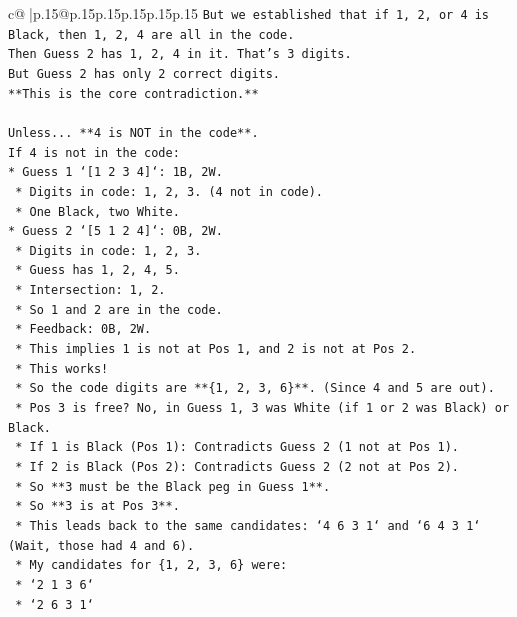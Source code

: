 \documentclass{article}
\begin{document}
{\begin{supertabular}{c@{$\;$}|p{.15\linewidth}@{}p{.15\linewidth}p{.15\linewidth}p{.15\linewidth}p{.15\linewidth}p{.15\linewidth}}
{{{\texttt{But we established that if 1, 2, or 4 is Black, then 1, 2, 4 are all in the code.} \\
\texttt{Then Guess 2 has 1, 2, 4 in it. That's 3 digits.} \\
\texttt{But Guess 2 has only 2 correct digits.} \\
\texttt{**This is the core contradiction.**} \\
\\ 
\texttt{Unless... **4 is NOT in the code**.} \\
\texttt{If 4 is not in the code:} \\
\texttt{*   Guess 1 `{[}1 2 3 4{]}`: 1B, 2W.} \\
\texttt{    *   Digits in code: 1, 2, 3. (4 not in code).} \\
\texttt{    *   One Black, two White.} \\
\texttt{*   Guess 2 `{[}5 1 2 4{]}`: 0B, 2W.} \\
\texttt{    *   Digits in code: 1, 2, 3.} \\
\texttt{    *   Guess has 1, 2, 4, 5.} \\
\texttt{    *   Intersection: 1, 2.} \\
\texttt{    *   So 1 and 2 are in the code.} \\
\texttt{    *   Feedback: 0B, 2W.} \\
\texttt{    *   This implies 1 is not at Pos 1, and 2 is not at Pos 2.} \\
\texttt{    *   This works!} \\
\texttt{    *   So the code digits are **\{1, 2, 3, 6\}**. (Since 4 and 5 are out).} \\
\texttt{    *   Pos 3 is free? No, in Guess 1, 3 was White (if 1 or 2 was Black) or Black.} \\
\texttt{    *   If 1 is Black (Pos 1): Contradicts Guess 2 (1 not at Pos 1).} \\
\texttt{    *   If 2 is Black (Pos 2): Contradicts Guess 2 (2 not at Pos 2).} \\
\texttt{    *   So **3 must be the Black peg in Guess 1**.} \\
\texttt{    *   So **3 is at Pos 3**.} \\
\texttt{    *   This leads back to the same candidates: `4 6 3 1` and `6 4 3 1` (Wait, those had 4 and 6).} \\
\texttt{    *   My candidates for \{1, 2, 3, 6\} were:} \\
\texttt{        *   `2 1 3 6`} \\
\texttt{        *   `2 6 3 1`} \\
}}}
\end{supertabular}}
\end{document}
